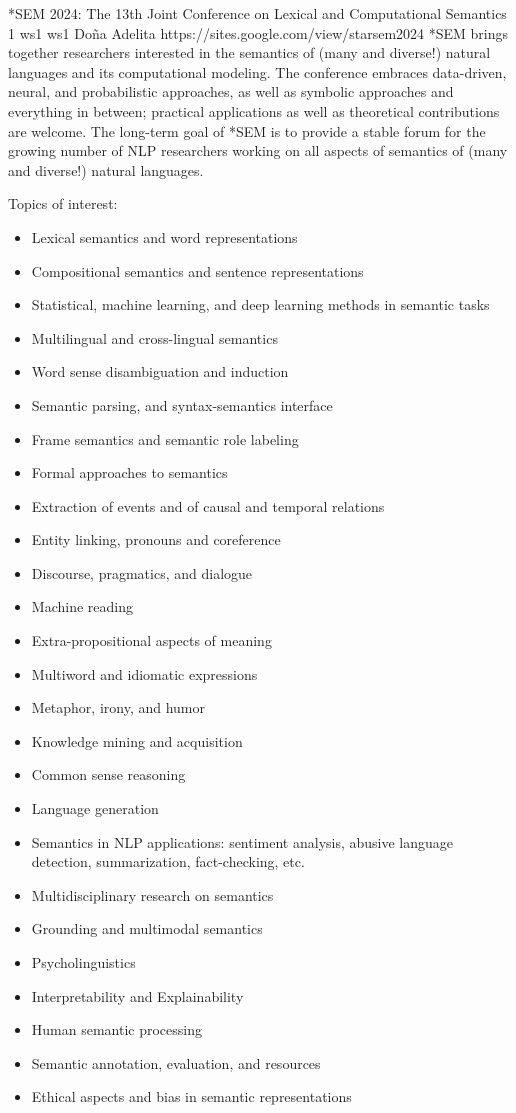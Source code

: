 \begin{wsschedulenolist}
{*SEM 2024: The 13th Joint Conference on Lexical and Computational Semantics}
{1}
{ws1}
{ws1}
{Do\~na Adelita}
{https://sites.google.com/view/starsem2024}
    *SEM brings together researchers interested in the semantics of (many and diverse!) natural languages and its computational modeling. The conference embraces data-driven, neural, and probabilistic approaches, as well as symbolic approaches and everything in between; practical applications as well as theoretical contributions are welcome. The long-term goal of *SEM is to provide a stable forum for the growing number of NLP researchers working on all aspects of semantics of (many and diverse!) natural languages.

    Topics of interest:

\begin{itemize}
\setlength{\itemsep}{-0.3ex}
\item Lexical semantics and word representations
\item Compositional semantics and sentence representations
\item Statistical, machine learning, and deep learning methods in semantic tasks
\item Multilingual and cross-lingual semantics
\item Word sense disambiguation and induction
\item Semantic parsing, and syntax-semantics interface
\item Frame semantics and semantic role labeling
\item Formal approaches to semantics
\item Extraction of events and of causal and temporal relations
\item Entity linking, pronouns and coreference
\item Discourse, pragmatics, and dialogue
\item Machine reading
\item Extra-propositional aspects of meaning
\item Multiword and idiomatic expressions
\item Metaphor, irony, and humor
\item Knowledge mining and acquisition
\item Common sense reasoning
\item Language generation
\item Semantics in NLP applications: sentiment analysis, abusive language detection, summarization, fact-checking, etc.
\item Multidisciplinary research on semantics
\item Grounding and multimodal semantics
\item Psycholinguistics
\item Interpretability and Explainability
\item Human semantic processing
\item Semantic annotation, evaluation, and resources
\item Ethical aspects and bias in semantic representations
\end{itemize}
\end{wsschedulenolist}
